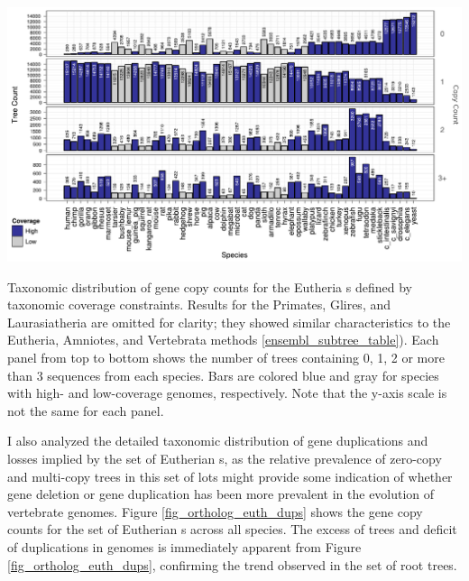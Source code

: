 \bbfig
\centering
\includegraphics[scale=0.83]{Figs/dups_euth_roots.pdf}
\caption{Taxonomic distribution of gene copy counts for the Eutheria
  \subtr{}s defined by taxonomic coverage constraints. Results for the
  Primates, Glires, and Laurasiatheria are omitted for clarity; they
  showed similar characteristics to the Eutheria, Amniotes, and
  Vertebrata methods \ref{ensembl_subtree_table}). Each panel from top
  to bottom shows the number of trees containing 0, 1, 2 or more than
  3 sequences from each species. Bars are colored blue and gray for
  species with high- and low-coverage genomes, respectively. Note that
  the y-axis scale is not the same for each panel.}
\label{fig_ortholog_euth_dups}
\eefig

I also analyzed the detailed taxonomic distribution of gene
duplications and losses implied by the set of Eutherian \subtr{}s, as
the relative prevalence of zero-copy and multi-copy trees in this set
of \acp{lot} might provide some indication of whether gene deletion or
gene duplication has been more prevalent in the evolution of
vertebrate genomes. Figure \ref{fig_ortholog_euth_dups} shows the gene
copy counts for the set of Eutherian \subtr{}s across all \ens
species. The excess of \zcop trees and deficit
of duplications in \lcv genomes is immediately apparent from Figure
\ref{fig_ortholog_euth_dups}, confirming the trend observed in the set
of root \cmp trees.

